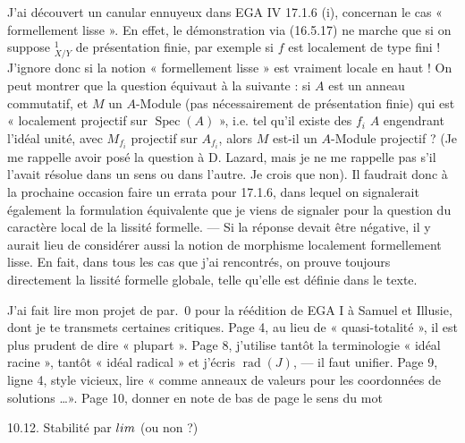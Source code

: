 \documentclass[11pt,a4paper]{article}
\begin{document}
J'ai découvert un canular ennuyeux dans EGA IV 17.1.6 (i), concernan le cas
« formellement lisse ». En effet, le démonstration via (16.5.17) ne marche que
si on suppose \supplied{$\Omega$}$^1_{X/Y}$ de présentation finie, par exemple
si $f$ est localement de type fini ! J'ignore donc si la notion « formellement
lisse » est vraiment locale en haut ! On peut montrer que la question équivaut
à la suivante : si $A$ est un anneau commutatif, et $M$ un $A$-Module (pas
nécessairement de présentation finie) qui est « localement projectif sur
$\operatorname{Spec}(A)$ », i.e. tel qu'il existe des $f_i$ \supplied{$\in$}
$A$ engendrant l'idéal unité, avec $M_{f_i}$ projectif sur $A_{f_i}$, alors
$M$ est-il un $A$-Module projectif ? (Je me rappelle avoir posé la question à
D. Lazard, mais je ne me rappelle pas s'il l'avait résolue dans un sens ou
dans l'autre. Je crois que non). Il faudrait donc à la prochaine occasion
faire un errata pour 17.1.6, dans lequel on signalerait également la
formulation équivalente que je viens de signaler pour la question du
caractère local de la lissité formelle. --- Si la réponse devait être
négative, il y aurait lieu de considérer aussi la notion de morphisme
localement formellement lisse. En fait, dans tous les cas que j'ai
rencontrés, on prouve toujours directement la lissité formelle globale, telle
qu'elle est définie dans le texte.

J'ai fait lire mon projet de par.~0 pour la réédition de EGA I à Samuel et
Illusie, dont je te transmets certaines critiques. Page 4, au lieu de
« quasi-totalité », il est plus prudent de dire « plupart ». Page 8,
j'utilise tantôt la terminologie « idéal racine », tantôt « idéal radical »
et j'écris $\operatorname{rad}(J)$, --- il faut unifier. Page 9, ligne 4,
style vicieux, lire « comme anneaux de valeurs pour les coordonnées de
solutions \ldots ». Page 10, donner en note de bas de page le sens du mot



10.12. \quad Stabilité par $\varprojlim$ (ou non ?)

\end{document}
